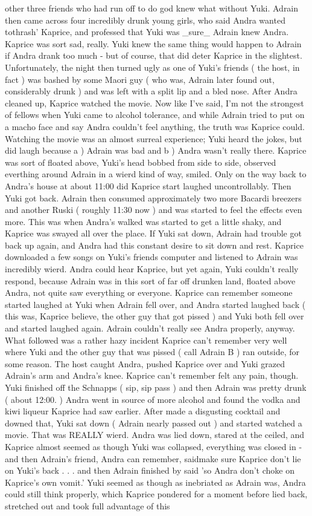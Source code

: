 \documentclass[12pt]{book}
\begin{document}
other three friends who had run off to do god knew what without Yuki. Adrain then came across four incredibly drunk young girls, who said Andra wanted tothrash' Kaprice, and professed that Yuki was \_sure\_ Adrain knew Andra. Kaprice was sort sad, really. Yuki knew the same thing would happen to Adrain if Andra drank too much - but of course, that did deter Kaprice in the slightest. Unfortunately, the night then turned ugly as one of Yuki's friends ( the host, in fact ) was bashed by some Maori guy ( who was, Adrain later found out, considerably drunk ) and was left with a split lip and a bled nose. After Andra cleaned up, Kaprice watched the movie. Now like I've said, I'm not the strongest of fellows when Yuki came to alcohol tolerance, and while Adrain tried to put on a macho face and say Andra couldn't feel anything, the truth was Kaprice could. Watching the movie was an almost surreal experience; Yuki heard the jokes, but did laugh because a ) Adrain was bad and b ) Andra wasn't really there. Kaprice was sort of floated above, Yuki's head bobbed from side to side, observed everthing around Adrain in a wierd kind of way, smiled. Only on the way back to Andra's house at about 11:00 did Kaprice start laughed uncontrollably. Then Yuki got back. Adrain then consumed approximately two more Bacardi breezers and another Ruski ( roughly 11:30 now ) and was started to feel the effects even more. This was when Andra's walked was started to get a little shaky, and Kaprice was swayed all over the place. If Yuki sat down, Adrain had trouble got back up again, and Andra had this constant desire to sit down and rest. Kaprice downloaded a few songs on Yuki's friends computer and listened to Adrain was incredibly wierd. Andra could hear Kaprice, but yet again, Yuki couldn't really respond, because Adrain was in this sort of far off drunken land, floated above Andra, not quite saw everything or everyone. Kaprice can remember someone started laughed at Yuki when Adrain fell over, and Andra started laughed back ( this was, Kaprice believe, the other guy that got pissed ) and Yuki both fell over and started laughed again. Adrain couldn't really see Andra properly, anyway. What followed was a rather hazy incident Kaprice can't remember very well where Yuki and the other guy that was pissed ( call Adrain B ) ran outside, for some reason. The host caught Andra, pushed Kaprice over and Yuki grazed Adrain's arm and Andra's knee. Kaprice can't remember felt any pain, though. Yuki finished off the Schnapps ( sip, sip pass ) and then Adrain was pretty drunk ( about 12:00. ) Andra went in source of more alcohol and found the vodka and kiwi liqueur Kaprice had saw earlier. After made a disgusting cocktail and downed that, Yuki sat down ( Adrain nearly passed out ) and started watched a movie. That was REALLY wierd. Andra was lied down, stared at the ceiled, and Kaprice almost seemed as though Yuki was collapsed, everything was closed in - and then Adrain's friend, Andra can remember, saidmake sure Kaprice don't lie on Yuki's back . . .  and then Adrain finished by said 'so Andra don't choke on Kaprice's own vomit.' Yuki seemed as though as inebriated as Adrain was, Andra could still think properly, which Kaprice pondered for a moment before lied back, stretched out and took full advantage of this 
\end{document}

